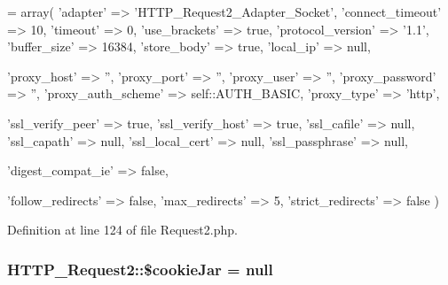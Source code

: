 \begin{DoxyCode}
= array(
        \textcolor{stringliteral}{'adapter'}           => \textcolor{stringliteral}{'HTTP\_Request2\_Adapter\_Socket'},
        \textcolor{stringliteral}{'connect\_timeout'}   => 10,
        \textcolor{stringliteral}{'timeout'}           => 0,
        \textcolor{stringliteral}{'use\_brackets'}      => \textcolor{keyword}{true},
        \textcolor{stringliteral}{'protocol\_version'}  => \textcolor{stringliteral}{'1.1'},
        \textcolor{stringliteral}{'buffer\_size'}       => 16384,
        \textcolor{stringliteral}{'store\_body'}        => \textcolor{keyword}{true},
        \textcolor{stringliteral}{'local\_ip'}          => null,

        \textcolor{stringliteral}{'proxy\_host'}        => \textcolor{stringliteral}{''},
        \textcolor{stringliteral}{'proxy\_port'}        => \textcolor{stringliteral}{''},
        \textcolor{stringliteral}{'proxy\_user'}        => \textcolor{stringliteral}{''},
        \textcolor{stringliteral}{'proxy\_password'}    => \textcolor{stringliteral}{''},
        \textcolor{stringliteral}{'proxy\_auth\_scheme'} => self::AUTH\_BASIC,
        \textcolor{stringliteral}{'proxy\_type'}        => \textcolor{stringliteral}{'http'},

        \textcolor{stringliteral}{'ssl\_verify\_peer'}   => \textcolor{keyword}{true},
        \textcolor{stringliteral}{'ssl\_verify\_host'}   => \textcolor{keyword}{true},
        \textcolor{stringliteral}{'ssl\_cafile'}        => null,
        \textcolor{stringliteral}{'ssl\_capath'}        => null,
        \textcolor{stringliteral}{'ssl\_local\_cert'}    => null,
        \textcolor{stringliteral}{'ssl\_passphrase'}    => null,

        \textcolor{stringliteral}{'digest\_compat\_ie'}  => \textcolor{keyword}{false},

        \textcolor{stringliteral}{'follow\_redirects'}  => \textcolor{keyword}{false},
        \textcolor{stringliteral}{'max\_redirects'}     => 5,
        \textcolor{stringliteral}{'strict\_redirects'}  => \textcolor{keyword}{false}
    )
\end{DoxyCode}


Definition at line 124 of file Request2.\-php.

\hypertarget{classHTTP__Request2_a1a4f35074ef955bfe726e85b76ed17a9}{
\subsubsection[{\$cookie\-Jar}]{\setlength{\rightskip}{0pt plus 5cm}H\-T\-T\-P\-\_\-\-Request2\-::\$cookie\-Jar = null\hspace{0.3cm}{\ttfamily [protected]}}}\label{classHTTP__Request2_a1a4f35074ef955bfe726e85b76ed17a9}


